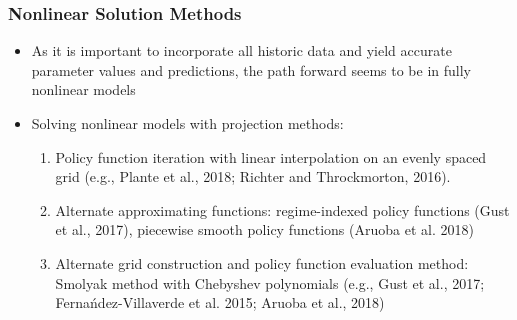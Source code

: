 \documentclass[11pt]{beamer}
\begin{document}
\begin{frame}\frametitle{Nonlinear Solution Methods}
\begin{itemize}\setlength{\itemsep}{10pt}
	\item  <1-|handout:1>As it is important to incorporate all historic data and yield accurate parameter values and predictions, the path forward seems to be in fully nonlinear models
	\item <2-|handout:1>Solving nonlinear models with projection methods:
\begin{enumerate}
		\item  <3-|handout:1>Policy function iteration with linear interpolation on an evenly spaced grid (e.g., Plante et al., 2018; Richter and Throckmorton, 2016).
		\item  <3-|handout:1>Alternate approximating functions: regime-indexed policy functions (Gust et al., 2017), piecewise smooth policy functions (Aruoba et al. 2018)
		\item  <3-|handout:1>Alternate grid construction and policy function evaluation method: Smolyak method with Chebyshev polynomials (e.g., Gust et al., 2017; Ferna\'ndez-Villaverde et al. 2015; Aruoba et al., 2018)
	\end{enumerate}
\end{itemize}
\end{frame}
\end{document}

